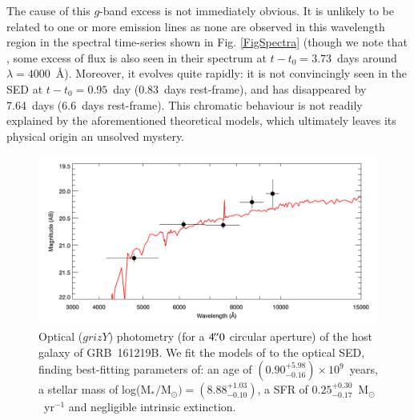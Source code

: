 \documentclass[traditabstract,longauth]{aa}
\begin{document}
The cause of this $g$-band excess is not immediately obvious.  It is unlikely to be related to one or more emission lines as none are observed in this wavelength region in the spectral time-series shown in Fig. \ref{FigSpectra} (though we note that \citealt{Ashall17}, some excess of flux is also seen in their spectrum at $t-t_0=3.73$~days around $\lambda=4000$~\AA).  Moreover, it evolves quite rapidly: it is not convincingly seen in the SED at $t-t_0=0.95$~day (0.83~days rest-frame), and has disappeared by 7.64~days (6.6~days rest-frame).  This chromatic behaviour is not readily explained by the aforementioned theoretical models, which ultimately leaves its physical origin an unsolved mystery.



\begin{figure}
   \includegraphics[width=\hsize]{Fig15_host161219B-eps-converted-to.pdf}
      \caption{Optical ($grizY$) photometry (for a $4\hbox{$.\!\!^{\prime\prime}$}0$ circular aperture) of the host galaxy of GRB~161219B.  We fit the models of \citet{Bruzual03} to the optical SED, finding best-fitting parameters of: an age of $(0.90_{-0.16}^{+5.98})\times10^9$~years, a stellar mass of log(M$_{*}/$M$_{\odot})=(8.88_{-0.10}^{+1.03})$, a SFR of $0.25_{-0.17}^{+0.30}$~M$_{\odot}$~yr$^{-1}$ and negligible intrinsic extinction.}
         \label{FigHostSED}
\end{figure}
\end{document}
